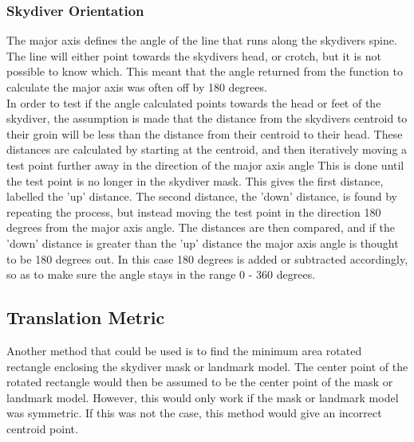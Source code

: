 \documentclass[a4paper, 12pt]{article}
\begin{document}
		\subsubsection{Skydiver Orientation}
		The major axis defines the angle of the line that runs along the skydivers spine.
		The line will either point towards the skydivers head, or crotch, but it is not possible to know which.
		This meant that the angle returned from the function to calculate the major axis was often off by 180 degrees.\\
		In order to test if the angle calculated points towards the head or feet of the skydiver,
		the assumption is made that the distance from the skydivers centroid to their groin will be less
		than the distance from their centroid to their head.
		These distances are calculated by starting at the centroid, and then iteratively moving a
		test point further away in the direction of the major axis angle
		This is done until the test point is no longer in the skydiver mask.
		This gives the first distance, labelled the 'up' distance.
		The second distance, the 'down' distance, is found by repeating the process, but instead moving the
		test point in the direction 180 degrees from the major axis angle.
		The distances are then compared, and if the 'down' distance is greater than the 'up' distance
		the major axis angle is thought to be 180 degrees out.
		In this case 180 degrees is added or subtracted
		accordingly, so as to make sure the angle stays in the range 0 - 360 degrees.
%
	\subsection{Translation Metric}
	Another method that could be used is to find the minimum area rotated rectangle enclosing the skydiver mask or landmark model.
	The center point of the rotated rectangle would then be assumed to be the center point of the mask or landmark model.
	However, this would only work if the mask or landmark model was symmetric. 
	If this was not the case, this method would give an incorrect centroid point.
	
\end{document}
